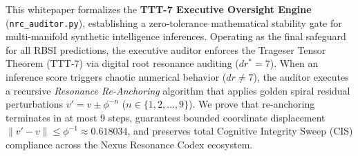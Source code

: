 \begin{abstractbox}
This whitepaper formalizes the \textbf{TTT-7 Executive Oversight Engine} (\texttt{nrc\_auditor.py}), establishing a zero-tolerance mathematical stability gate for multi-manifold synthetic intelligence inferences. Operating as the final safeguard for all RBSI predictions, the executive auditor enforces the Trageser Tensor Theorem (TTT-7) via digital root resonance auditing ($dr^* = 7$). When an inference score triggers chaotic numerical behavior ($dr \neq 7$), the auditor executes a recursive \textit{Resonance Re-Anchoring} algorithm that applies golden spiral residual perturbations $v' = v \pm \phi^{-n}$ ($n \in \{1, 2, \dots, 9\}$). We prove that re-anchoring terminates in at most 9 steps, guarantees bounded coordinate displacement $\|v' - v\| \le \phi^{-1} \approx 0.618034$, and preserves total Cognitive Integrity Sweep (CIS) compliance across the Nexus Resonance Codex ecosystem.
\end{abstractbox}
